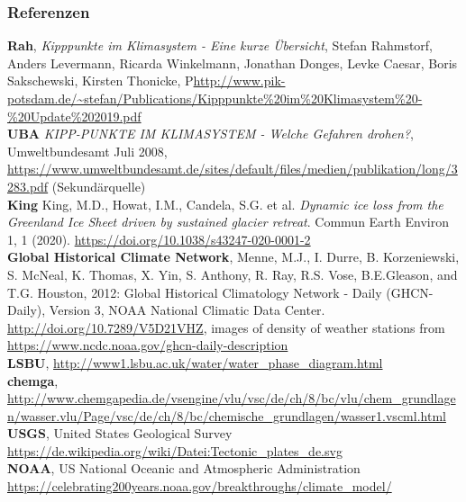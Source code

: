 \begin{frame}
	\frametitle{Referenzen}
	\small{
	\textbf{Rah}, \textit{Kipppunkte im Klimasystem - Eine kurze Übersicht},
	Stefan Rahmstorf, Anders Levermann, Ricarda Winkelmann, Jonathan Donges, Levke Caesar, Boris Sakschewski, Kirsten Thonicke,
	P\url{http://www.pik-potsdam.de/~stefan/Publications/Kipppunkte\%20im\%20Klimasystem\%20-\%20Update\%202019.pdf} \\
	\textbf{UBA} \textit{KIPP-PUNKTE IM KLIMASYSTEM - Welche Gefahren drohen?}, Umweltbundesamt Juli 2008, \url{https://www.umweltbundesamt.de/sites/default/files/medien/publikation/long/3283.pdf} (Sekundärquelle)\\
	\textbf{King} King, M.D., Howat, I.M., Candela, S.G. et al. \textit{Dynamic ice loss from the Greenland Ice Sheet driven by sustained glacier retreat}. Commun Earth Environ 1, 1 (2020). \url{https://doi.org/10.1038/s43247-020-0001-2}\\
	\textbf{Global Historical Climate Network}, Menne, M.J., I. Durre, B. Korzeniewski, S. McNeal, K. Thomas, X. Yin, S. Anthony, R. Ray, R.S. Vose, B.E.Gleason, and T.G. Houston, 2012: Global Historical Climatology Network - Daily (GHCN-Daily), Version 3, NOAA National Climatic Data Center. \url{http://doi.org/10.7289/V5D21VHZ}, images of density of weather stations from \url{https://www.ncdc.noaa.gov/ghcn-daily-description}\\
	\textbf{LSBU}, \url{http://www1.lsbu.ac.uk/water/water_phase_diagram.html}\\
	\textbf{chemga}, \url{http://www.chemgapedia.de/vsengine/vlu/vsc/de/ch/8/bc/vlu/chem_grundlagen/wasser.vlu/Page/vsc/de/ch/8/bc/chemische_grundlagen/wasser1.vscml.html}\\
	\textbf{USGS}, United States Geological Survey \url{https://de.wikipedia.org/wiki/Datei:Tectonic_plates_de.svg}\\
	\textbf{NOAA}, US National Oceanic and Atmospheric Administration \url{https://celebrating200years.noaa.gov/breakthroughs/climate_model/}\\
	}
\end{frame}
